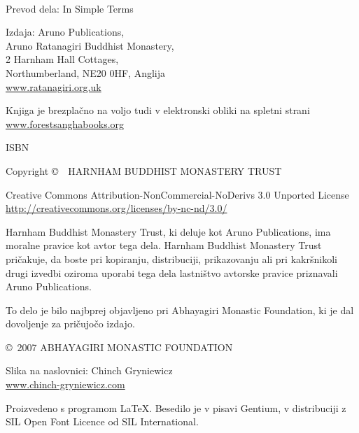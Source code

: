 \enlargethispage{2\baselineskip}
{\small\setlength{\parskip}{0.7em}\setlength{\parindent}{0em}%
{\raggedright%

\thetitle\\
\theauthor

Prevod dela: In Simple Terms

Izdaja: Aruno Publications,\\
Aruno Ratanagiri Buddhist Monastery,\\
2 Harnham Hall Cottages,\\
Northumberland, NE20 0HF, Anglija\\
\href{http://ratanagiri.org.uk}{www.ratanagiri.org.uk}

Knjiga je brezplačno na voljo tudi v elektronski obliki na spletni strani\\
\href{http://forestsanghabooks.org/}{www.forestsanghabooks.org}

ISBN \theISBN

Copyright \copyright\ \the\year\ HARNHAM BUDDHIST MONASTERY TRUST

\vfill

{\footnotesize

Creative Commons Attribution-NonCommercial-NoDerivs 3.0 Unported License\\
\href{http://creativecommons.org/licenses/by-nc-nd/3.0/}{http://creativecommons.org/licenses/by-nc-nd/3.0/}

Harnham Buddhist Monastery Trust, ki deluje kot Aruno Publications, ima moralne pravice kot avtor tega dela. Harnham Buddhist Monastery Trust pričakuje, da boste pri kopiranju, distribuciji, prikazovanju ali pri kakršnikoli drugi izvedbi oziroma uporabi tega dela lastništvo avtorske pravice priznavali Aruno Publications.

To delo je bilo najbprej objavljeno pri Abhayagiri Monastic Foundation, ki je dal dovoljenje za pričujočo izdajo.

\copyright\ 2007 ABHAYAGIRI MONASTIC FOUNDATION

Slika na naslovnici: Chinch Gryniewicz\\
\href{http://chinch-gryniewicz.com}{www.chinch-gryniewicz.com}

Proizvedeno s programom {\selectfont\LaTeX}. Besedilo je v pisavi Gentium, v distribuciji z SIL Open Font Licence od SIL International.

\theEditionInfo

\thePrintedByInfo

}

}}

